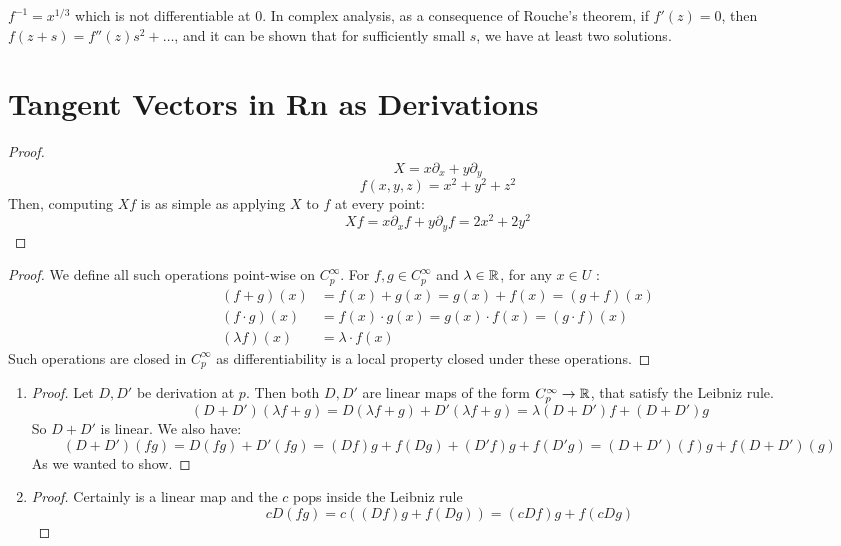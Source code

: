 \begin{problem}
$f^{-1} = x^{1/3}$ which is not differentiable at $0$. In complex analysis, as a consequence of Rouche's theorem,
if $f'(z) = 0$, then $f(z + s) = f''(z)s^2 + \dots$, and it can be shown that for sufficiently small $s$, we have at least two solutions.

\end{problem}

\section{Tangent Vectors in Rn as Derivations}

\begin{problem}
\end{problem}
\begin{proof}
	$$ X = x\partial_x + y\partial_y$$
	$$ f(x,y,z) =  x^2 + y^2 + z^2$$
	Then, computing $Xf$ is as simple as applying $X$ to $f$ at every point:
	$$Xf = x\partial_x f + y\partial_y f = 2x^2 + 2y^2$$
\end{proof}

\begin{problem}
\end{problem}

\begin{proof}
	We define all such operations point-wise on $C_{p}^{\infty}$. For $f,g \in C_{p}^{\infty}$ and $\lambda \in \mathbb{R}$,
	for any $x \in U$ :
	\begin{align*}
		(f + g) (x)     & = f(x) + g(x) = g(x) + f(x) =  (g + f)(x)             \\
		(f \cdot g) (x) & = f(x) \cdot g(x) = g(x) \cdot f(x) =  (g \cdot f)(x) \\
		(\lambda f) (x) & = \lambda \cdot f(x)
	\end{align*}
	Such operations are closed in $C_{p}^{\infty}$ as differentiability is a local property closed under these
	operations.
\end{proof}

\begin{problem}
\end{problem}


\begin{enumerate}[label=(\alph*)]
	\item \begin{proof}
		      Let $D, D'$ be derivation at $p$. Then both $D,D'$ are linear maps of the form $C_p^{\infty} \rightarrow \mathbb{R}$, that
		      satisfy the Leibniz rule.
		      $$(D + D')(\lambda f + g) = D(\lambda f + g) + D'(\lambda f + g) = \lambda (D + D')f + (D + D')g$$
		      So $D + D'$ is linear. We also have:
		      $$(D + D')(fg) = D(fg) + D'(fg) = (Df)g + f(Dg) + (D'f)g + f(D'g) = (D + D')(f)g + f(D + D')(g)$$
		      As we wanted to show.
	      \end{proof}
	\item \begin{proof}
		      Certainly is a linear map and the $c$ pops inside the Leibniz rule
		      $$cD(fg) = c((Df)g + f(Dg)) = (cDf)g + f(cDg)$$
	      \end{proof}
\end{enumerate}

